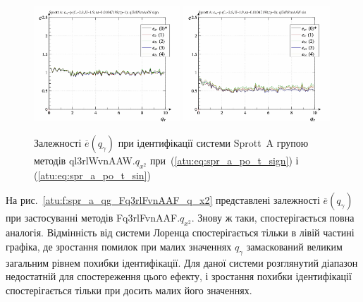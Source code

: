 \begin{figure}[htb!]
  \centerline{
    \includegraphics[width=0.49\textwidth]{p/cha/spr_a/ql3rlWvnAAW_x2/sprott_a_id-p_q_gamma_sign.png}
    \hfill
    \includegraphics[width=0.49\textwidth]{p/cha/spr_a/ql3rlWvnAAW_x2/sprott_a_id-p_q_gamma_sin.png}
  }
\caption{Залежності $ \overline{e} (q_\gamma) $ при ідентифікації системи Sprott~A групою методів ql3rlWvnAAW.$q_{x^2} $ при~(\ref{atu:eq:spr_a_po_t_sign}) і (\ref{atu:eq:spr_a_po_t_sin})}
  \label{atu:f:spr_a_ql3rlWvnAAW_q_x2}
\end{figure}

На рис.~\ref{atu:f:spr_a_qg_Fq3rlFvnAAF_q_x2} представлені залежності
$ \overline{e} (q_\gamma) $ при застосуванні методів Fq3rlFvnAAF.$q_{x^2} $.
Знову ж таки, спостерігається повна
аналогія. Відмінність від системи Лоренца спостерігається
тільки в лівій частині графіка, де зростання помилок при малих
значеннях
$ q_\gamma $ замаскований великим загальним рівнем похибки
ідентифікації. Для даної системи розглянутий діапазон
недостатній для спостереження цього ефекту, і зростання похибки
ідентифікації спостерігається тільки при досить малих його
значеннях.

